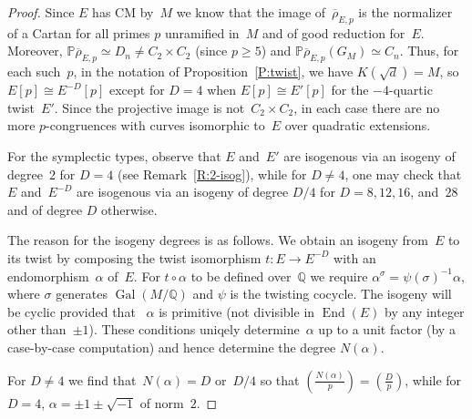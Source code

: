 \documentclass[12pt, reqno]{amsart}
\newcommand{\PP}{\mathbb{P}}
\newcommand{\Q}{\mathbb{Q}}
\newcommand{\Z}{\mathbb{Z}}
\newcommand{\rhobar}{{\overline{\rho}}}
\DeclareMathOperator{\End}{End}
\DeclareMathOperator{\Gal}{Gal}
\def\legendre#1#2{\left(\displaystyle\frac{#1}{#2}\right)}
\numberwithin{equation}{section}
\theoremstyle{definition}
\theoremstyle{remark}
\begin{document}
\begin{proof}
Since $E$ has CM by~$M$ we know that the image of~$\rhobar_{E,p}$ is
the normalizer of a Cartan for all primes $p$ unramified in~$M$ and of
good reduction for~$E$.  Moreover, $\PP \rhobar_{E,p} \simeq D_n \neq
C_2 \times C_2$ (since $p \geq 5$) and $\PP \rhobar_{E,p}(G_M) \simeq
C_n$. Thus, for each such~$p$, in the notation of
Proposition~\ref{P:twist}, we have $K(\sqrt{d})=M$, so $E[p]\cong
E^{-D}[p]$ except for $D=4$ when $E[p]\cong E'[p]$ for the
$-4$-quartic twist~$E'$.  Since the projective image is not~$C_2\times
C_2$, in each case there are no more $p$-congruences with curves
isomorphic to~$E$ over quadratic extensions.

For the symplectic types, observe that $E$ and~$E'$ are isogenous via
an isogeny of degree~$2$ for $D=4$ (see Remark~\ref{R:2-isog}), while
for $D\not=4$, one may check that $E$ and~$E^{-D}$ are isogenous via
an isogeny of degree $D/4$ for $D=8,12,16$, and~$28$ and of degree $D$
otherwise.

The reason for the isogeny degrees is as follows.  We obtain an
isogeny from~$E$ to its twist by composing the twist isomorphism
$t:E\to E^{-D}$ with an endomorphism~$\alpha$ of~$E$.  For
$t\circ\alpha$ to be defined over~$\Q$ we require
$\alpha^{\sigma}=\psi(\sigma)^{-1}\alpha$, where $\sigma$ generates
$\Gal(M/\Q)$ and $\psi$ is the twisting cocycle.  The isogeny will be
cyclic provided that ~$\alpha$ is primitive (not divisible in
$\End(E)$ by any integer other than~$\pm1$).  These conditions uniqely
determine~$\alpha$ up to a unit factor (by a case-by-case computation)
and hence determine the degree $N(\alpha)$.
\begin{comment}
  Apart from the special case $D=4$, we have $\psi(\sigma)=-1$, so
$\alpha$ is pure imaginary.  This uniquely determines~$\alpha$ up to
sign, and the degree of the isogeny is the norm of~$\alpha$:

$D = 3, 7, 11, 19, 43, 67, 163$: $\End(E)\cong\Z[(1+\sqrt{-D})/2]$,
$\alpha=\pm\sqrt{-D}$, norm~$D$.

$D = 16$: $\End(E)\cong\Z[2\sqrt{-1}]$, $\alpha=\pm2\sqrt{-1}$, norm~$4$.

$D = 8$: $\End(E)\cong\Z[\sqrt{-2}]$, $\alpha=\pm\sqrt{-2}$, norm~$2$.

$D = 12$: $\End(E)\cong\Z[\sqrt{-3}]$, $\alpha=\pm\sqrt{-3}$, norm~$3$.

$D = 27$: $\End(E)\cong\Z[3\sqrt{-3}]$, $\alpha=\pm3\sqrt{-3}$, norm~$27$.

$D = 28$: $\End(E)\cong\Z[\sqrt{-7}]$, $\alpha=\pm\sqrt{-7}$, norm~$7$.

When $D=4$ we have $\psi(\sigma)=\pm i$ and $\alpha=\pm1\pm i$, with
norm~$2$.
\end{comment}
For $D\not=4$ we find that~$N(\alpha)=D$ or~$D/4$ so that
$\legendre{N(\alpha)}{p}=\legendre{D}{p}$, while for $D=4$,
$\alpha=\pm1\pm\sqrt{-1}$ of norm~$2$.
\end{proof}
\end{document}
